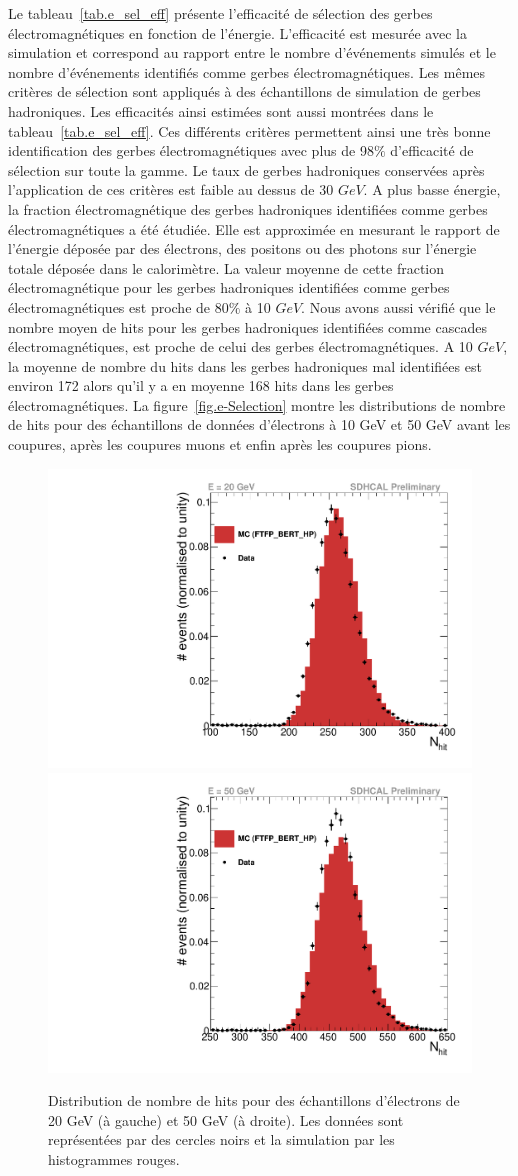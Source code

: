 Le tableau~\ref{tab.e_sel_eff} présente l'efficacité de sélection des gerbes électromagnétiques en fonction de l'énergie. L'efficacité est mesurée avec la simulation et correspond au rapport entre le nombre d'événements simulés et le nombre d'événements identifiés comme gerbes électromagnétiques. Les mêmes critères de sélection sont appliqués à des échantillons de simulation de gerbes hadroniques. Les efficacités ainsi estimées sont aussi montrées dans le tableau~\ref{tab.e_sel_eff}. Ces différents critères permettent ainsi une très bonne identification des gerbes électromagnétiques avec plus de 98$\%$ d'efficacité de sélection sur toute la gamme. Le taux de gerbes hadroniques conservées après l'application de ces critères est faible au dessus de 30 $GeV$. A plus basse énergie, la fraction électromagnétique des gerbes hadroniques identifiées comme gerbes électromagnétiques a été étudiée. Elle est approximée en mesurant le rapport de l'énergie déposée par des électrons, des positons ou des photons sur l'énergie totale déposée dans le calorimètre. La valeur moyenne de cette fraction électromagnétique pour les gerbes hadroniques identifiées comme gerbes électromagnétiques est proche de 80$\%$ à 10 $GeV$. Nous avons aussi vérifié que le nombre moyen de hits pour les gerbes hadroniques identifiées comme cascades électromagnétiques, est proche de celui des gerbes électromagnétiques. A 10 $GeV$, la moyenne de nombre du hits dans les gerbes hadroniques mal identifiées est environ 172 alors qu'il y a en moyenne 168 hits dans les gerbes électromagnétiques. 
La figure~\ref{fig.e-Selection} montre les distributions de nombre de hits pour des échantillons de données d'électrons à 10 GeV et 50 GeV avant les coupures, après les coupures muons et enfin après les coupures pions.
\begin{figure}[!ht]
    \includegraphics[width=.45\textwidth]{Digitizer/figs/nhit_e-_20GeV_AugSep2012.pdf}
    \includegraphics[width=.45\textwidth]{Digitizer/figs/nhit_e-_50GeV_AugSep2012.pdf}
    \caption{Distribution de nombre de hits pour des échantillons d'électrons de 20 GeV (à gauche) et 50 GeV (à droite). Les données sont représentées par des cercles noirs et la simulation par les histogrammes rouges.}
  \label{fig.nhite-_dist}
\end{figure}
